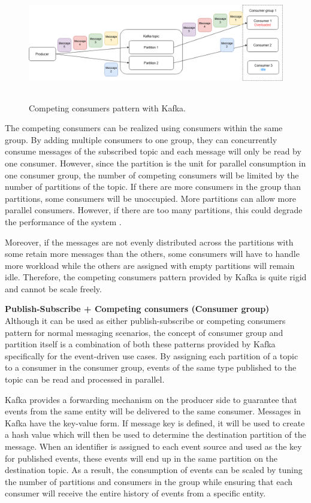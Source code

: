 \begin{figure}[h]
	\centering
	\includegraphics[width=\linewidth,height=5cm]{images/competing-consumers-kafka.png}
	\caption{Competing consumers pattern with Kafka.}
	\label{fig:kafkacompetingconsumer}
\end{figure}
The competing consumers can be realized using consumers within the same group. By adding multiple consumers to one group, they can concurrently consume messages of the subscribed topic and each message will only be read by one consumer. However, since the partition is the unit for parallel consumption in one consumer group, the number of competing consumers will be limited by the number of partitions of the topic. If there are more consumers in the group than partitions, some consumers will be unoccupied. More partitions can allow more parallel consumers. However, if there are too many partitions, this could degrade the performance of the system \cite{kafkapartitionsnum}.

Moreover, if the messages are not evenly distributed across the partitions with some retain more messages than the others, some consumers will have to handle more workload while the others are assigned with empty partitions will remain idle. Therefore, the competing consumers pattern provided by Kafka is quite rigid and cannot be scale freely.

\textbf{Publish-Subscribe + Competing consumers (Consumer group)}\\
Although it can be used as either publish-subscribe or competing consumers pattern for normal messaging scenarios, the concept of consumer group and partition itself is a combination of both these patterns provided by Kafka specifically for the event-driven use cases. By assigning each partition of a topic to a consumer in the consumer group, events of the same type published to the topic can be read and processed in parallel. 

Kafka provides a forwarding mechanism on the producer side to guarantee that events from the same entity will be delivered to the same consumer. Messages in Kafka have the key-value form. If message key is defined, it will be used to create a hash value which will then be used to determine the destination partition of the message. When an identifier is assigned to each event source and used as the key for published events, these events will end up in the same partition on the destination topic. As a result, the consumption of events can be scaled by tuning the number of partitions and consumers in the group while ensuring that each consumer will receive the entire history of events from a specific entity.  

